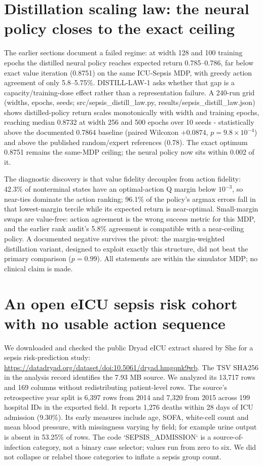 \section{Distillation scaling law: the neural policy closes to the exact ceiling}
The earlier sections document a failed regime: at width 128 and 100 training
epochs the distilled neural policy reaches expected return 0.785--0.786, far
below exact value iteration (0.8751) on the same ICU-Sepsis MDP, with greedy
action agreement of only 5.8--5.75\%. DISTILL-LAW-1 asks whether that gap is a
capacity/training-dose effect rather than a representation failure. A 240-run
grid (widths, epochs, seeds; src/sepsis\_distill\_law.py,
results/sepsis\_distill\_law.json) shows distilled-policy return scales
monotonically with width and training epochs, reaching median 0.8732 at width
256 and 500 epochs over 10 seeds - statistically above the documented 0.7864
baseline (paired Wilcoxon $+0.0874$, $p=9.8\times10^{-4}$) and above the
published random/expert references (0.78). The exact optimum 0.8751 remains the
same-MDP ceiling; the neural policy now sits within 0.002 of it.

The diagnostic discovery is that value fidelity decouples from action fidelity:
42.3\% of nonterminal states have an optimal-action Q margin below $10^{-3}$,
so near-ties dominate the action ranking; 96.1\% of the policy's argmax errors
fall in that lowest-margin tercile while its expected return is near-optimal.
Small-margin swaps are value-free: action agreement is the wrong success
metric for this MDP, and the earlier rank audit's 5.8\% agreement is compatible
with a near-ceiling policy. A documented negative survives the pivot: the
margin-weighted distillation variant, designed to exploit exactly this
structure, did not beat the primary comparison ($p=0.99$). All statements are
within the simulator MDP; no clinical claim is made.
\section{An open eICU sepsis risk cohort with no usable action sequence}
We downloaded and checked the public Dryad eICU extract shared by She for a sepsis risk-prediction study: \url{https://datadryad.org/dataset/doi:10.5061/dryad.hmgqnk9wb}. The TSV SHA256 in the analysis record identifies the 7.93 MB source. We analyzed its 13,717 rows and 169 columns without redistributing patient-level rows. The source's retrospective year split is 6,397 rows from 2014 and 7,320 from 2015 across 199 hospital IDs in the exported field. It reports 1,276 deaths within 28 days of ICU admission (9.30\%). Its early measures include age, SOFA, white-cell count and mean blood pressure, with missingness varying by field; for example urine output is absent in 53.25\% of rows. The code `SEPSIS\_ADMISSION` is a source-of-infection category, not a binary case selector; values run from zero to six. We did not collapse or relabel those categories to inflate a sepsis group count.

